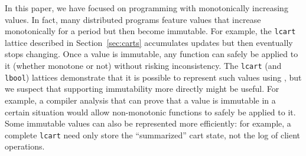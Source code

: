 In this paper, we have focused on programming with monotonically increasing
values. In fact, many distributed programs feature values that increase
monotonically for a period but then become immutable. For example, the
\texttt{lcart} lattice described in Section~\ref{sec:carts} accumulates updates
but then eventually stops changing. Once a value is immutable, any function can
safely be applied to it (whether monotone or not) without risking
inconsistency. The \texttt{lcart} (and \texttt{lbool}) lattices demonstrate that
it is possible to represent such values using \lang, but we suspect that
supporting immutability more directly might be useful. For example, a compiler
analysis that can prove that a value is immutable in a certain situation would
allow non-monotonic functions to safely be applied to it. Some immutable values
can also be represented more efficiently: for example, a complete \texttt{lcart}
need only store the ``summarized'' cart state, not the log of client operations.




